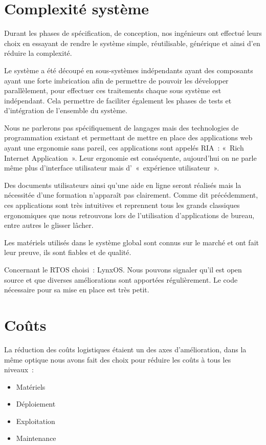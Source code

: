\section{Complexité système}


Durant les phases de spécification, de conception, nos ingénieurs ont effectué leurs choix en essayant de rendre le système simple, réutilisable, générique et ainsi d’en réduire la complexité.

\par Le système a été découpé en sous-systèmes indépendants ayant des composants ayant une forte imbrication afin de permettre de pouvoir les développer parallèlement, pour effectuer ces traitements chaque sous système est indépendant. Cela permettre de faciliter également les phases de tests et d’intégration de l’ensemble du système.

\par Nous ne parlerons pas spécifiquement de langages mais des technologies de programmation existant et permettant de mettre en place des applications web ayant une ergonomie sans pareil, ces applications sont appelés RIA : « Rich Internet Application ». Leur ergonomie est conséquente, aujourd’hui on ne parle même plus d’interface utilisateur mais d’ « expérience utilisateur ».
	
\par Des documents utilisateurs ainsi qu’une aide en ligne seront réalisés mais la nécessitée d’une formation n’apparaît pas clairement. Comme dit précédemment, ces applications sont très intuitives et reprennent tous les grands classiques ergonomiques que nous retrouvons lors de l’utilisation d’applications de bureau, entre autres le glisser lâcher.

\par Les matériels utilisés dans le système global sont connus sur le marché et ont fait leur preuve, ils sont fiables et de qualité.

\par Concernant le RTOS choisi : LynxOS. Nous pouvons signaler qu’il est open source et que diverses améliorations sont apportées régulièrement. Le code nécessaire pour sa mise en place est très petit.

\section{Coûts}

La réduction des coûts logistiques étaient un des axes d’amélioration, dans la même optique nous avons fait des choix pour réduire les coûts à tous les niveaux : 
\begin{itemize}
\item Matériels
\item Déploiement
\item Exploitation
\item Maintenance
\end{itemize}

